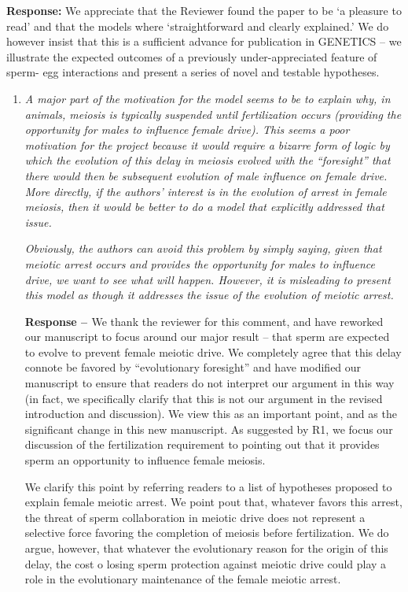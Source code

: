 \documentclass[12pt,letterpaper]{article}
\begin{document}
{\bf{Response:}} We appreciate that the Reviewer found the paper to be `a pleasure 
to read' and that the models  where `straightforward and clearly explained.'
We do however insist that this is a sufficient advance for publication in GENETICS --
 we illustrate the expected outcomes of a previously under-appreciated feature of sperm-
 egg interactions and present a series of novel and testable hypotheses. 
\begin{enumerate}
\item
\begin{singlespace}
\emph{A major part of the motivation for the model seems to be to explain why, in
animals, meiosis is typically suspended until fertilization occurs (providing
the opportunity for males to influence female drive).  This seems a poor
motivation for the project because it would require a bizarre form of logic by
which the evolution of this delay in meiosis evolved with the ``foresight'' that
there would then be subsequent evolution of male influence on female drive. 
More directly, if the authors' interest is in the evolution of arrest in female
meiosis, then it would be better to do a model that explicitly addressed that
issue.  }

\emph{Obviously, the authors can avoid this problem by simply saying, given that
meiotic arrest occurs and provides the opportunity for males to influence drive,
we want to see what will happen.  However, it is misleading to present this
model as though it addresses the issue of the evolution of meiotic arrest.}
\end{singlespace}

\begin{singlespace}
{\bf{Response -- }} We thank the reviewer for this comment, and have reworked our manuscript to focus 
	around our major result -- that sperm are expected to evolve to prevent female meiotic drive. 
	We completely agree that this delay connote be favored by ``evolutionary foresight'' and have 
	modified our manuscript to ensure that readers do not interpret our argument in this way 
	(in fact, we specifically clarify that this is not our argument in the revised introduction and discussion). 
	We view this as an important point, and as the significant change in this new manuscript. 
	As suggested by R1, we focus our discussion of the fertilization requirement to pointing out that it 
	provides sperm an opportunity to influence female meiosis.  
	
	We clarify this point by referring readers to a list of hypotheses proposed to explain female meiotic arrest. 
	We point pout that, whatever favors this arrest,	 the threat of sperm collaboration in meiotic drive does not 
	represent a selective force favoring the  completion of meiosis before fertilization.
	We do argue, however, that whatever the evolutionary reason for the origin of this delay, the cost o losing 
	sperm protection against meiotic drive could play a role in the evolutionary maintenance  of the female meiotic arrest. \\
\end{singlespace}


\end{enumerate}
\end{document}
